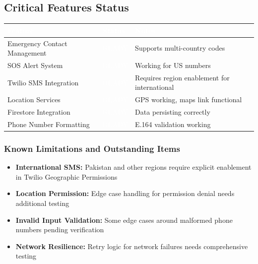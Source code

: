 \documentclass[12pt,a4paper]{article}
\begin{document}
\subsection{Critical Features Status}
\begin{table}[h]
\centering
\setlength{\extrarowheight}{12pt}
\begin{tabularx}{\textwidth}{|l|X|X|}
\hline
\rowcolor{headercolor}
\textcolor{white}{\textbf{Feature}} & \textcolor{white}{\textbf{Status}} & \textcolor{white}{\textbf{Notes}} \\
\hline
Emergency Contact Management & \cellcolor{passcolor}\textcolor{white}{READY} & Supports multi-country codes \\
\hline
SOS Alert System & \cellcolor{passcolor}\textcolor{white}{READY} & Working for US numbers \\
\hline
Twilio SMS Integration & \cellcolor{passcolor}\textcolor{white}{READY} & Requires region enablement for international \\
\hline
Location Services & \cellcolor{passcolor}\textcolor{white}{READY} & GPS working, maps link functional \\
\hline
Firestore Integration & \cellcolor{passcolor}\textcolor{white}{READY} & Data persisting correctly \\
\hline
Phone Number Formatting & \cellcolor{passcolor}\textcolor{white}{READY} & E.164 validation working \\
\hline
\end{tabularx}
\end{table}

\subsubsection{Known Limitations and Outstanding Items}
\begin{itemize}
    \item \textbf{International SMS:} Pakistan and other regions require explicit enablement in Twilio Geographic Permissions
    \item \textbf{Location Permission:} Edge case handling for permission denial needs additional testing
    \item \textbf{Invalid Input Validation:} Some edge cases around malformed phone numbers pending verification
    \item \textbf{Network Resilience:} Retry logic for network failures needs comprehensive testing
\end{itemize}
\end{document}
